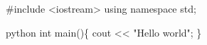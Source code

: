 
\begin{DoxyCode}
#include <iostream>
using namespace std;

python
int main()\{
    cout << "Hello world";
\}
\end{DoxyCode}
 